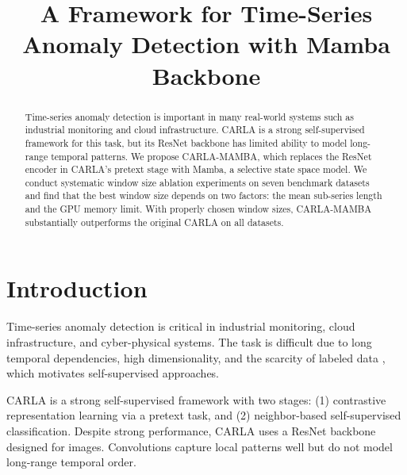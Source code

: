 \documentclass[runningheads]{llncs}
\begin{document}
\title{A Framework for Time-Series Anomaly Detection with Mamba Backbone}



\maketitle

\begin{abstract}
Time-series anomaly detection is important in many real-world systems such as industrial monitoring and cloud infrastructure. CARLA is a strong self-supervised framework for this task, but its ResNet backbone has limited ability to model long-range temporal patterns. We propose CARLA-MAMBA, which replaces the ResNet encoder in CARLA's pretext stage with Mamba, a selective state space model. We conduct systematic window size ablation experiments on seven benchmark datasets and find that the best window size depends on two factors: the mean sub-series length and the GPU memory limit. With properly chosen window sizes, CARLA-MAMBA substantially outperforms the original CARLA on all datasets.
\end{abstract}

\section{Introduction}
\label{sec:introduction}

Time-series anomaly detection is critical in industrial monitoring, cloud infrastructure, and cyber-physical systems. The task is difficult due to long temporal dependencies, high dimensionality, and the scarcity of labeled data \cite{darban2022deep}, which motivates self-supervised approaches.

CARLA \cite{darban2024carla} is a strong self-supervised framework with two stages: (1) contrastive representation learning via a pretext task, and (2) neighbor-based self-supervised classification. Despite strong performance, CARLA uses a ResNet backbone \cite{fawaz2019deep} designed for images. Convolutions capture local patterns well but do not model long-range temporal order.
\end{document}
